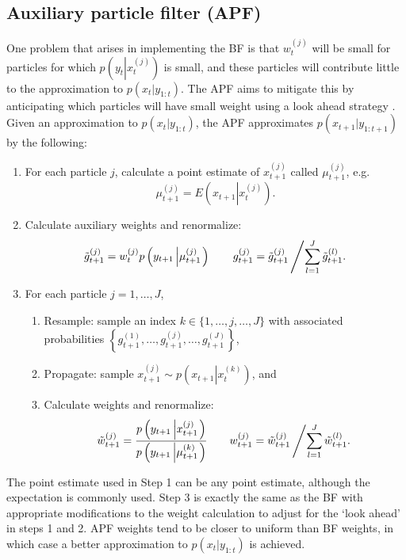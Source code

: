 \subsection{Auxiliary particle filter (APF) \label{sec:apf}}

One problem that arises in implementing the BF is that $w_t^{(j)}$ will be small for particles for which $p\left(y_{t}\left|x_{t}^{(j)}\right.\right)$ is small, and these particles will contribute little to the approximation to $p(x_{t}|y_{1:t})$. The APF aims to mitigate this by anticipating which particles will have small weight using a look ahead strategy \citep{Pitt:Shep:filt:1999}. Given an approximation to $p(x_t|y_{1:t})$, the APF approximates $p(x_{t+1}|y_{1:t+1})$ by the following:
\begin{enumerate}
\item For each particle $j$, calculate a point estimate of $x_{t+1}^{(j)}$ called $\mu_{t+1}^{(j)}$, e.g.
\[ \mu_{t+1}^{(j)} = E\left(x_{t+1}\left|x_t^{(j)} \right.\right). \]
\item Calculate auxiliary weights and renormalize:
\[ \tilde{g}_{t+1}^{(j)} = w_t^{(j)} p\left(y_{t+1}\left|\mu_{t+1}^{(j)}\right.\right) \qquad g_{t+1}^{(j)} = \tilde{g}_{t+1}^{(j)}\left/\sum_{l=1}^J \tilde{g}_{t+1}^{(l)}.\right. \]
\item For each particle $j=1,\ldots,J$,
	\begin{enumerate}
    \item Resample: sample an index $k\in\{1,\ldots,j,\ldots,J\}$ with associated probabilities $\left\{g_{t+1}^{(1)},\ldots,g_{t+1}^{(j)},\ldots,g_{t+1}^{(J)}\right\}$,
	\item Propagate: sample $x_{t+1}^{(j)} \sim p\left(x_{t+1}\left|x_t^{(k)}\right.\right)$, and
	\item Calculate weights and renormalize:
\[ \tilde{w}_{t+1}^{(j)} = \frac{p\left(y_{t+1}\left|x_{t+1}^{(j)}\right.\right)}{p\left(y_{t+1}\left|\mu_{t+1}^{(k)}\right.\right)} \qquad w_{t+1}^{(j)} = \tilde{w}_{t+1}^{(j)}\left/\sum_{l=1}^J \tilde{w}_{t+1}^{(l)}. \right. \]
	\end{enumerate}
\end{enumerate}
The point estimate used in Step 1 can be any point estimate, although the expectation is commonly used. Step 3 is exactly the same as the BF with appropriate modifications to the weight calculation to adjust for the `look ahead' in steps 1 and 2. APF weights tend to be closer to uniform than BF weights, in which case a better approximation to $p(x_{t}|y_{1:t})$ is achieved.

